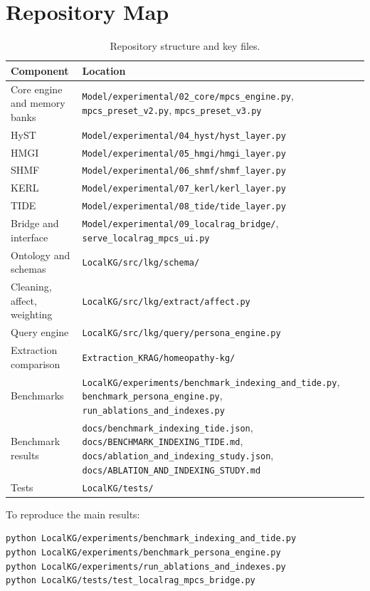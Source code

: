 \documentclass[12pt,a4paper,oneside]{report}
\newcommand{\code}[1]{\texttt{\small #1}}
\begin{document}
\appendix
{}
\chapter{Repository Map}\label{app:repo}
\begin{table}[H]
\centering
\caption{Repository structure and key files.}
\label{tab:repo}
\small
\begin{tabularx}{\linewidth}{@{}l X@{}}
\toprule
Component & Location\\
\midrule
Core engine and memory banks & \code{Model/experimental/02\_core/mpcs\_engine.py}, \code{mpcs\_preset\_v2.py}, \code{mpcs\_preset\_v3.py}\\
HyST & \code{Model/experimental/04\_hyst/hyst\_layer.py}\\
HMGI & \code{Model/experimental/05\_hmgi/hmgi\_layer.py}\\
SHMF & \code{Model/experimental/06\_shmf/shmf\_layer.py}\\
KERL & \code{Model/experimental/07\_kerl/kerl\_layer.py}\\
TIDE & \code{Model/experimental/08\_tide/tide\_layer.py}\\
Bridge and interface & \code{Model/experimental/09\_localrag\_bridge/}, \code{serve\_localrag\_mpcs\_ui.py}\\
Ontology and schemas & \code{LocalKG/src/lkg/schema/}\\
Cleaning, affect, weighting & \code{LocalKG/src/lkg/extract/affect.py}\\
Query engine & \code{LocalKG/src/lkg/query/persona\_engine.py}\\
Extraction comparison & \code{Extraction\_KRAG/homeopathy-kg/}\\
Benchmarks & \code{LocalKG/experiments/benchmark\_indexing\_and\_tide.py}, \code{benchmark\_persona\_engine.py}, \code{run\_ablations\_and\_indexes.py}\\
Benchmark results & \code{docs/benchmark\_indexing\_tide.json}, \code{docs/BENCHMARK\_INDEXING\_TIDE.md}, \code{docs/ablation\_and\_indexing\_study.json}, \code{docs/ABLATION\_AND\_INDEXING\_STUDY.md}\\
Tests & \code{LocalKG/tests/}\\
\bottomrule
\end{tabularx}
\end{table}

\noindent To reproduce the main results:
\begin{lstlisting}[language=bash]
python LocalKG/experiments/benchmark_indexing_and_tide.py
python LocalKG/experiments/benchmark_persona_engine.py
python LocalKG/experiments/run_ablations_and_indexes.py
python LocalKG/tests/test_localrag_mpcs_bridge.py
\end{lstlisting}
\end{document}
